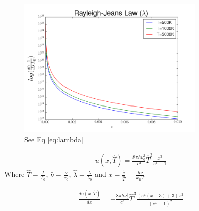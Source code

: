 \documentclass[12pt]{article}
\begin{document}
  
  \begin{figure}[h]
    \centering
    \includegraphics[width=0.8\textwidth]{Problem9b.png}
    \caption{See Eq \ref{eq:lambda}}
  \end{figure}

  \clearpage

  \begin{align}
    u(x,\hat{T}) = \frac{8\pi h \nu_0^3}{c^3}\hat{T}^3\frac{x^3}{e^x-1} \nonumber
  \end{align}
  Where $\hat{T} \equiv \frac{T}{T_0}$, $\hat{\nu} \equiv \frac{\nu}{\nu_0}$,
  $\hat{\lambda} \equiv \frac{\lambda}{\lambda_0}$ and $x \equiv \frac{\hat{\nu}}{\hat{T}} = \frac{h\nu}{k_BT}$

  \begin{align}
    \frac{du(x,\hat{T})}{dx} = -\frac{8\pi h \nu_0^3}{c^3}\hat{T}^3\frac{(e^x(x-3)+3)x^2}{(e^x-1)^2} \nonumber
  \end{align}

  
\end{document}
